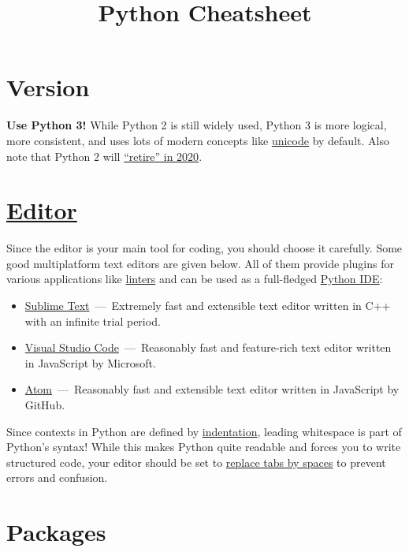 \documentclass[rules]{cheatsheet}
\begin{document}
\title{Python Cheatsheet}

\section{Version}

\textbf{Use Python 3!} While Python 2 is still widely used, Python 3 is more logical, more consistent, and uses lots of modern concepts like \href{https://docs.python.org/3/howto/unicode.html}{unicode} by default. Also note that Python 2 will \href{https://legacy.python.org/dev/peps/pep-0373/}{\enquote{retire} in 2020}.

\section{\href{https://wiki.python.org/moin/PythonEditors}{Editor}}

Since the editor is your main tool for coding, you should choose it carefully. Some good multiplatform text editors are given below. All of them provide plugins for various applications like \href{https://realpython.com/python-code-quality/#linters}{linters} and can be used as a full-fledged \href{https://realpython.com/python-ides-code-editors-guide/}{Python IDE}:
\begin{itemize}
  \item \href{http://www.sublimetext.com/}%
    {Sublime Text}~---~Extremely fast and extensible text editor written in C++ with an infinite trial period.
  \item \href{https://code.visualstudio.com/}%
    {Visual Studio Code}~---~Reasonably fast and feature-rich text editor written in JavaScript by Microsoft.
  \item \href{https://atom.io/}%
    {Atom}~---~Reasonably fast and extensible text editor written in JavaScript by GitHub.
\end{itemize}

Since contexts in Python are defined by \href{https://docs.python.org/2.0/ref/indentation.html}{indentation}, leading whitespace is part of Python's syntax! While this makes Python quite readable and forces you to write structured code, your editor should be set to \href{https://www.python.org/dev/peps/pep-0008/#tabs-or-spaces}{replace tabs by spaces} to prevent errors and confusion.

\section{Packages}
\end{document}
